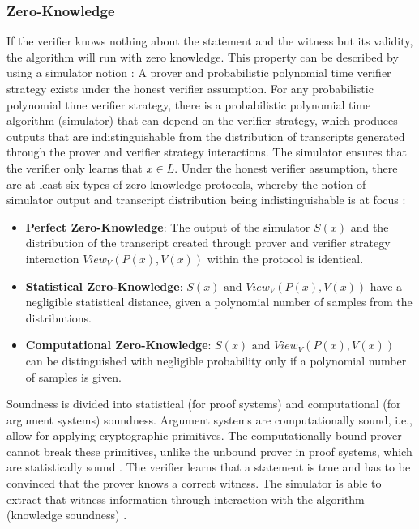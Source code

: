 \subsubsection{Zero-Knowledge}
If the verifier knows nothing about the statement and the witness but its validity, the algorithm will run with zero knowledge. This property can be described by using a simulator notion \citep{Thaler}: A prover and probabilistic polynomial time verifier strategy exists under the honest verifier assumption. For any probabilistic polynomial time verifier strategy, there is a probabilistic polynomial time algorithm (simulator) that can depend on the verifier strategy, which produces outputs that are indistinguishable from the distribution of transcripts generated through the prover and verifier strategy interactions. The simulator ensures that the verifier only learns that \(x \in L\). Under the honest verifier assumption, there are at least six types of zero-knowledge protocols, whereby the notion of simulator output and transcript distribution being indistinguishable is at focus \citep{zktypes}:
\begin{itemize}
    \item \textbf{Perfect Zero-Knowledge}: The output of the simulator \(S(x)\) and the distribution of the transcript created through prover and verifier strategy interaction \(View_V(P(x), V(x))\) within the protocol is identical. 
    \item \textbf{Statistical Zero-Knowledge}: \(S(x) \text{ and } View_V(P(x), V(x))\) have a negligible statistical distance, given a polynomial number of samples from the distributions.
    \item \textbf{Computational Zero-Knowledge}: \(S(x) \text{ and } View_V(P(x), V(x))\) can be distinguished with negligible probability only if a polynomial number of samples is given.
\end{itemize}
Soundness is divided into statistical (for proof systems) and computational (for argument systems) soundness. Argument systems are computationally sound, i.e., allow for applying cryptographic primitives. The computationally bound prover cannot break these primitives, unlike the unbound prover in proof systems, which are statistically sound \citep{Thaler}. The verifier learns that a statement is true and has to be convinced that the prover knows a correct witness. The simulator is able to extract that witness information through interaction with the algorithm (knowledge soundness) \citep{NitulescuGentleIntroSNARKs}.

